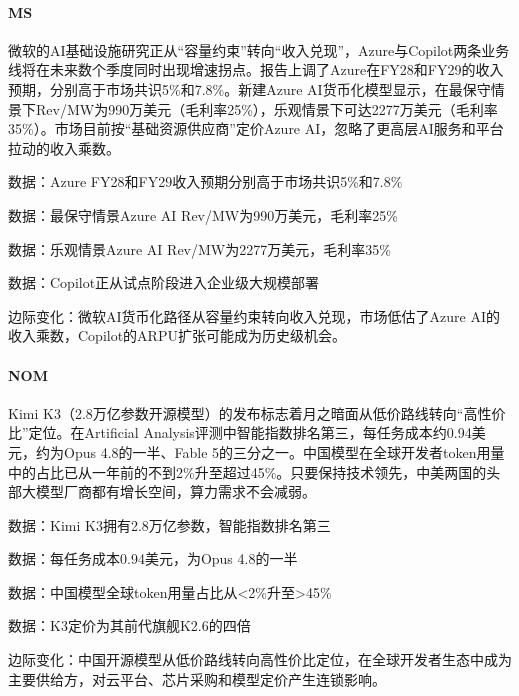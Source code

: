 \documentclass[11pt]{ctexart}
\begin{document}
\paragraph{MS} 微软的AI基础设施研究正从“容量约束”转向“收入兑现”，Azure与Copilot两条业务线将在未来数个季度同时出现增速拐点。报告上调了Azure在FY28和FY29的收入预期，分别高于市场共识5\%和7.8\%。新建Azure AI货币化模型显示，在最保守情景下Rev/MW为990万美元（毛利率25\%），乐观情景下可达2277万美元（毛利率35\%）。市场目前按“基础资源供应商”定价Azure AI，忽略了更高层AI服务和平台拉动的收入乘数。
{\small\color{refgray}数据：Azure FY28和FY29收入预期分别高于市场共识5\%和7.8\%\par}
{\small\color{refgray}数据：最保守情景Azure AI Rev/MW为990万美元，毛利率25\%\par}
{\small\color{refgray}数据：乐观情景Azure AI Rev/MW为2277万美元，毛利率35\%\par}
{\small\color{refgray}数据：Copilot正从试点阶段进入企业级大规模部署\par}
{\small\color{refgray}边际变化：微软AI货币化路径从容量约束转向收入兑现，市场低估了Azure AI的收入乘数，Copilot的ARPU扩张可能成为历史级机会。\par}
\paragraph{NOM} Kimi K3（2.8万亿参数开源模型）的发布标志着月之暗面从低价路线转向“高性价比”定位。在Artificial Analysis评测中智能指数排名第三，每任务成本约0.94美元，约为Opus 4.8的一半、Fable 5的三分之一。中国模型在全球开发者token用量中的占比已从一年前的不到2\%升至超过45\%。只要保持技术领先，中美两国的头部大模型厂商都有增长空间，算力需求不会减弱。
{\small\color{refgray}数据：Kimi K3拥有2.8万亿参数，智能指数排名第三\par}
{\small\color{refgray}数据：每任务成本0.94美元，为Opus 4.8的一半\par}
{\small\color{refgray}数据：中国模型全球token用量占比从<2\%升至>45\%\par}
{\small\color{refgray}数据：K3定价为其前代旗舰K2.6的四倍\par}
{\small\color{refgray}边际变化：中国开源模型从低价路线转向高性价比定位，在全球开发者生态中成为主要供给方，对云平台、芯片采购和模型定价产生连锁影响。\par}
\end{document}
